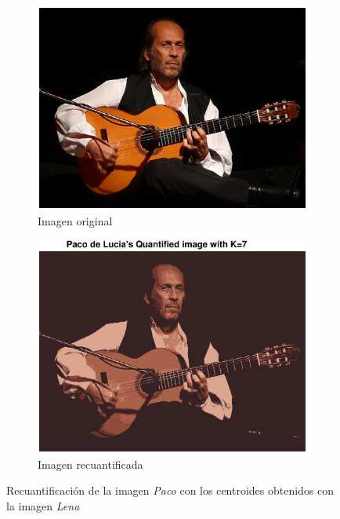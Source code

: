 \documentclass[11pt]{article} %
\begin{document}
\begin{figure}[h]
    \centering
    \begin{subfigure}[b]{0.435\textwidth}
        \includegraphics[width=\textwidth]{../src/fig/22_paco_original.eps}
        \caption[]{Imagen original}
        \label{fig:22:paco:original}
    \end{subfigure}
    \quad
    \begin{subfigure}[b]{0.435\textwidth}
        \includegraphics[width=\textwidth]{../src/fig/22_paco_requant.eps}
        \caption[]{Imagen recuantificada}
        \label{fig:22:paco:requant}
    \end{subfigure}
    \caption{Recuantificación de la imagen \emph{Paco} con los centroides
             obtenidos con la imagen \emph{Lena}}
    \label{fig:22:paco}
\end{figure}
\end{document}
